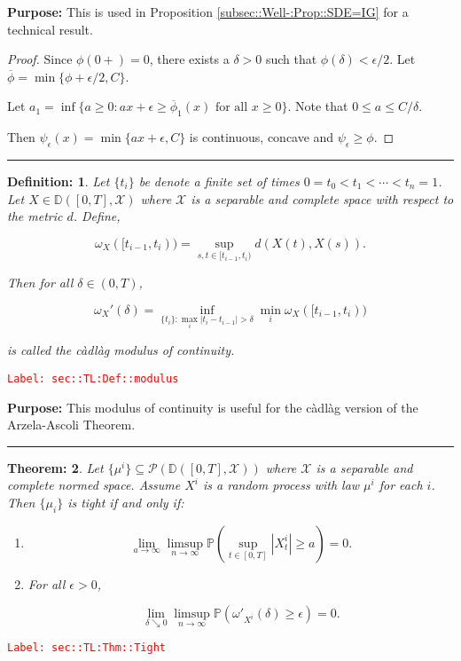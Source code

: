 \documentclass[12pt]{article}
\newcommand{\mb}{\mathbb}
\newcommand{\mc}{\mathcal}
\newcommand{\ra}{\rightarrow}
\newcommand{\ov}{\overline}
\newcommand{\te}{\text}
\newcommand{\ep}{\epsilon}
\newcommand{\tr}{\textcolor{red}}
\newcommand{\labe}[1]{\tr{\texttt{Label: #1}}}
\newcommand{\purpose}{\textbf{Purpose: }}
\newcommand{\ind}{\hspace{24pt}}
\newcommand{\lin}{\rule{\linewidth}{0.4 pt}}
\newcommand{\pr}{\mb{P}}							%
\newcommand{\cad}{\mb{D}}							%
\newtheorem{thms}{Theorem: }[section]
\newtheorem{defn}[thms]{Definition: }
\begin{document}
\purpose This is used in Proposition \ref{subsec::Well-:Prop::SDE=IG} for a technical result.

\begin{proof}
Since \(\phi(0+) = 0\), there exists a \(\delta > 0\) such that \(\phi(\delta) < \ep/2\). Let \(\ov{\phi} = \min\{\phi+\ep/2, C\}\).

\ind Let \(a_1 = \inf\{a \geq 0: ax + \ep \geq \ov{\phi}_1(x)\te{ for all } x\geq 0\}\). Note that \(0\leq a \leq C/\delta\). 

Then \(\psi_\ep(x) = \min\{ax+\ep,C\}\) is continuous, concave and \(\psi_\ep \geq \phi\).
\end{proof}

\lin

\begin{defn}
Let \(\{t_i\}\) be denote a finite set of times \(0=t_0 <t_1 <\cdots < t_n=1\). Let \(X\in \cad([0,T],\mc{X})\) where \(\mc{X}\) is a separable and complete space with respect to the metric \(d\). Define,

\[\omega_X([t_{i-1},t_i)) = \sup_{s,t\in [t_{i-1},t_i)} d(X(t),X(s)).\]

Then for all \(\delta \in (0,T)\),

\[\omega_X'(\delta) = \inf_{\{t_i\}: \max_i |t_i - t_{i-1}| > \delta} \min_{i} \omega_X([t_{i-1},t_i))\]

is called the c\`adl\`ag modulus of continuity.
\label{sec::TL:Def::modulus}
\end{defn}
\labe{sec::TL:Def::modulus}

\purpose This modulus of continuity is useful for the c\`adl\`ag version of the Arzela-Ascoli Theorem.

\lin

\begin{thms}
Let \(\{\mu^i\}\subseteq \mc{P}\left(\cad([0,T],\mc{X})\right)\) where \(\mc{X}\) is a separable and complete normed space. Assume \(X^i\) is a random process with law \(\mu^i\) for each \(i\). Then \(\{\mu_i\}\) is tight if and only if:

\begin{enumerate}[(1)]
\item 

\[\lim_{a \ra \infty}\limsup_{n \ra\infty} \pr\left(\sup_{t \in [0,T]} |X^i_t| \geq a\right) = 0.\]

\item For all \(\ep > 0\),

\[\lim_{\delta \searrow 0}\limsup_{n\ra\infty} \pr\left(\omega'_{X^i}(\delta) \geq \ep\right) = 0.\]
\end{enumerate}
\label{sec::TL:Thm::Tight}
\end{thms}
\labe{sec::TL:Thm::Tight}
\end{document}
